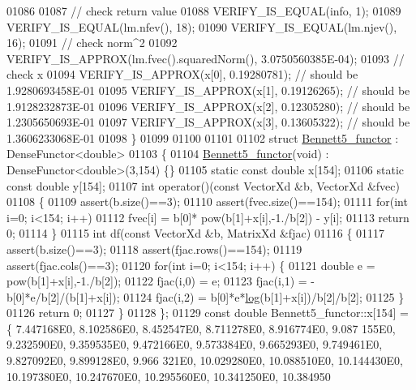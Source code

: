 \begin{DoxyCode}
01086 
01087   \textcolor{comment}{// check return value}
01088   VERIFY\_IS\_EQUAL(info, 1);
01089   VERIFY\_IS\_EQUAL(lm.nfev(), 18);
01090   VERIFY\_IS\_EQUAL(lm.njev(), 16);
01091   \textcolor{comment}{// check norm^2}
01092   VERIFY\_IS\_APPROX(lm.fvec().squaredNorm(), 3.0750560385E-04);
01093   \textcolor{comment}{// check x}
01094   VERIFY\_IS\_APPROX(x[0], 0.19280781); \textcolor{comment}{// should be 1.9280693458E-01}
01095   VERIFY\_IS\_APPROX(x[1], 0.19126265); \textcolor{comment}{// should be 1.9128232873E-01}
01096   VERIFY\_IS\_APPROX(x[2], 0.12305280); \textcolor{comment}{// should be 1.2305650693E-01}
01097   VERIFY\_IS\_APPROX(x[3], 0.13605322); \textcolor{comment}{// should be 1.3606233068E-01}
01098 \}
01099 
01100 
01101 
01102 \textcolor{keyword}{struct }\hyperlink{struct_bennett5__functor}{Bennett5\_functor} : DenseFunctor<double>
01103 \{
01104     \hyperlink{struct_bennett5__functor}{Bennett5\_functor}(\textcolor{keywordtype}{void}) : DenseFunctor<double>(3,154) \{\}
01105     \textcolor{keyword}{static} \textcolor{keyword}{const} \textcolor{keywordtype}{double} x[154];
01106     \textcolor{keyword}{static} \textcolor{keyword}{const} \textcolor{keywordtype}{double} y[154];
01107     \textcolor{keywordtype}{int} operator()(\textcolor{keyword}{const} VectorXd &b, VectorXd &fvec)
01108     \{
01109         assert(b.size()==3);
01110         assert(fvec.size()==154);
01111         \textcolor{keywordflow}{for}(\textcolor{keywordtype}{int} i=0; i<154; i++)
01112             fvec[i] = b[0]* pow(b[1]+x[i],-1./b[2]) - y[i];
01113         \textcolor{keywordflow}{return} 0;
01114     \}
01115     \textcolor{keywordtype}{int} df(\textcolor{keyword}{const} VectorXd &b, MatrixXd &fjac)
01116     \{
01117         assert(b.size()==3);
01118         assert(fjac.rows()==154);
01119         assert(fjac.cols()==3);
01120         \textcolor{keywordflow}{for}(\textcolor{keywordtype}{int} i=0; i<154; i++) \{
01121             \textcolor{keywordtype}{double} e = pow(b[1]+x[i],-1./b[2]);
01122             fjac(i,0) = e;
01123             fjac(i,1) = - b[0]*e/b[2]/(b[1]+x[i]);
01124             fjac(i,2) = b[0]*e*\hyperlink{structlog}{log}(b[1]+x[i])/b[2]/b[2];
01125         \}
01126         \textcolor{keywordflow}{return} 0;
01127     \}
01128 \};
01129 \textcolor{keyword}{const} \textcolor{keywordtype}{double} Bennett5\_functor::x[154] = \{ 7.447168E0, 8.102586E0, 8.452547E0, 8.711278E0, 8.916774E0, 9.087
      155E0, 9.232590E0, 9.359535E0, 9.472166E0, 9.573384E0, 9.665293E0, 9.749461E0, 9.827092E0, 9.899128E0, 9.966
      321E0, 10.029280E0, 10.088510E0, 10.144430E0, 10.197380E0, 10.247670E0, 10.295560E0, 10.341250E0, 10.384950

\end{DoxyCode}

